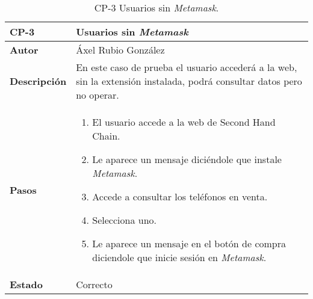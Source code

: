 \begin{table}[p]
	\centering
	\begin{tabularx}{\linewidth}{ p{} p{} }
		\toprule
		\textbf{CP-3}    & \textbf{Usuarios sin \textit{Metamask}}\\
		\toprule
		\textbf{Autor}                & Áxel Rubio González \\
		\textbf{Descripción}          & En este caso de prueba el usuario accederá a la web, sin la extensión instalada, podrá consultar datos pero no operar. \\
		\textbf{Pasos}             &
		\begin{enumerate}
			\def\labelenumi{\arabic{enumi}.}
			\tightlist
			\item El usuario accede a la web de Second Hand Chain.
                \item Le aparece un mensaje diciéndole que instale \textit{Metamask}.
                \item Accede a consultar los teléfonos en venta.
                \item Selecciona uno.
                \item Le aparece un mensaje en el botón de compra diciendole que inicie sesión en \textit{Metamask}.
		\end{enumerate}\\
		\textbf{Estado}          & Correcto \\
		\bottomrule
	\end{tabularx}
	\caption{CP-3 Usuarios sin \textit{Metamask}.}
\end{table}


